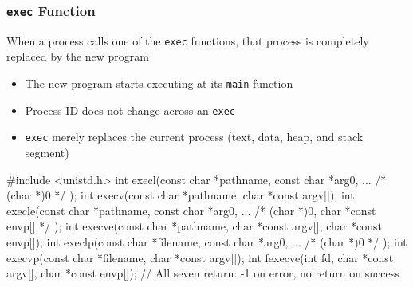 \documentclass[newPxFont,sthlmFooter,nooffset]{beamer}
\begin{document}
\begin{frame}[containsverbatim,t]
  \frametitle{\texttt{exec} Function}
When a process calls one of the \texttt{exec} functions, that process is completely replaced by the new program
\begin{itemize}
\item The new program starts executing at its \texttt{main} function
\item Process ID does not change across an \texttt{exec}
\item \texttt{exec} merely replaces the current process (text, data, heap, and stack segment)
\end{itemize}


\begin{codedef}
#include <unistd.h>
int execl(const char *pathname, const char *arg0, ... /* (char *)0 */ );
int execv(const char *pathname, char *const argv[]);
int execle(const char *pathname, const char *arg0, ... /* (char *)0, char *const envp[] */ );
int execve(const char *pathname, char *const argv[], char *const envp[]);
int execlp(const char *filename, const char *arg0, ... /* (char *)0 */ );
int execvp(const char *filename, char *const argv[]);
int fexecve(int fd, char *const argv[], char *const envp[]);
// All seven return: -1 on error, no return on success
\end{codedef}
\end{frame}
\end{document}
